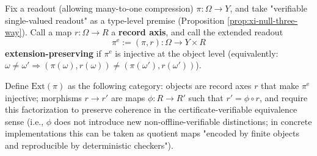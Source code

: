 \begin{definition}\label{def:xi-extension-preserving-category}
Fix a readout (allowing many-to-one compression) \(\pi:\Omega\to Y\), and take "verifiable single-valued readout" as a type-level premise (Proposition \ref{prop:xi-null-three-way}).
Call a map \(r:\Omega\to R\) a \textbf{record axis}, and call the extended readout
\[
\pi^{\mathrm e}:=(\pi,r):\Omega\to Y\times R
\]
\textbf{extension-preserving} if \(\pi^{\mathrm e}\) is injective at the object level (equivalently: \(\omega\neq\omega'\Rightarrow (\pi(\omega),r(\omega))\neq(\pi(\omega'),r(\omega'))\)).
\par
Define \(\mathrm{Ext}(\pi)\) as the following category: objects are record axes \(r\) that make \(\pi^{\mathrm e}\) injective;
morphisms \(r\to r'\) are maps \(\phi:R\to R'\) such that \(r'=\phi\circ r\), and require this factorization to preserve coherence in the certificate-verifiable equivalence sense (i.e., \(\phi\) does not introduce new non-offline-verifiable distinctions; in concrete implementations this can be taken as quotient maps "encoded by finite objects and reproducible by deterministic checkers").
\end{definition}


